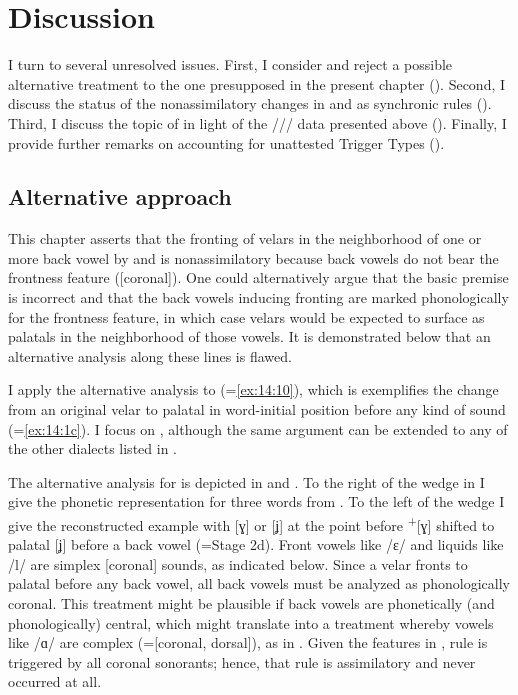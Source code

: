 \section{Discussion}\label{sec:14.6}

I turn to several unresolved issues. First, I consider and reject a possible alternative treatment to the one presupposed in the present chapter (). Second, I discuss the status of the nonassimilatory changes in  and  as synchronic rules (). Third, I discuss the topic of  in light of the /// data presented above (). Finally, I provide further remarks on accounting for unattested Trigger Types ().

\subsection{Alternative approach}\label{sec:14.6.1}

This chapter asserts that the fronting of velars in the neighborhood of one or more back vowel by  and  is nonassimilatory because back vowels do not bear the frontness feature ([coronal]). One could alternatively argue that the basic premise is incorrect and that the back vowels inducing fronting are marked phonologically for the frontness feature, in which case velars would be expected to surface as palatals in the neighborhood of those vowels. It is demonstrated below that an alternative analysis along these lines is flawed.

I apply the alternative analysis to  (=\ref{ex:14:10}), which is exemplifies the change from an original velar to palatal in word-initial position before any kind of sound (=\ref{ex:14:1c}). I focus on , although the same argument can be extended to any of the other dialects listed in .

The alternative analysis for  is depicted in  and . To the right of the wedge in  I give the phonetic representation for three words from . To the left of the wedge I give the reconstructed example with [ɣ] or [ʝ] at the point before  \textsuperscript{+}[ɣ] shifted to palatal [ʝ] before a back vowel (=Stage 2d). Front vowels like /ɛ/ and liquids like /l/ are simplex [coronal] sounds, as indicated below. Since a velar fronts to palatal before any back vowel, all back vowels must be analyzed as phonologically coronal. This treatment might be plausible if back vowels are phonetically (and phonologically) central, which might translate into a treatment whereby vowels like /ɑ/ are complex (=[coronal, dorsal]), as in . Given the features in , rule  is triggered by all coronal sonorants; hence, that rule is assimilatory and  never occurred at all.



